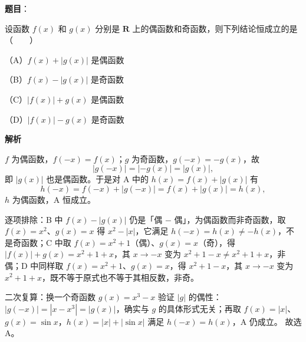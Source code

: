 \begin{answer}

\textbf{题目}：

设函数 $f(x)$ 和 $g(x)$ 分别是 $\mathbf R$ 上的偶函数和奇函数，则下列结论恒成立的是\mbox{（　　）}

（A）$f(x)+|g(x)|$ 是偶函数

（B）$f(x)-|g(x)|$ 是奇函数

（C）$|f(x)|+g(x)$ 是偶函数

（D）$|f(x)|-g(x)$ 是奇函数

\textbf{解析}

$f$ 为偶函数，$f(-x)=f(x)$；$g$ 为奇函数，$g(-x)=-g(x)$，故
\nopagebreak[4]
\[|g(-x)|=|-g(x)|=|g(x)|,\]
即 $|g(x)|$ 也是偶函数。于是对 A 中的 $h(x)=f(x)+|g(x)|$ 有
\nopagebreak[4]
\[h(-x)=f(-x)+|g(-x)|=f(x)+|g(x)|=h(x),\]
$h$ 为偶函数，A 恒成立。

逐项排除：B 中 $f(x)-|g(x)|$ 仍是「偶 $-$ 偶」，为偶函数而非奇函数，取 $f(x)=x^2$、$g(x)=x$ 得 $x^2-|x|$，它满足 $h(-x)=h(x)\ne-h(x)$，不是奇函数；C 中取 $f(x)=x^2+1$（偶）、$g(x)=x$（奇），得 $|f(x)|+g(x)=x^2+1+x$，其 $x\to-x$ 变为 $x^2+1-x\ne x^2+1+x$，非偶；D 中同样取 $f(x)=x^2+1$、$g(x)=x$，得 $x^2+1-x$，其 $x\to-x$ 变为 $x^2+1+x$，既不等于原式也不等于其相反数，非奇。

二次复算：换一个奇函数 $g(x)=x^3-x$ 验证 $|g|$ 的偶性：$|g(-x)|=|x-x^3|=|g(x)|$，确实与 $g$ 的具体形式无关；再取 $f(x)=|x|$、$g(x)=\sin x$，$h(x)=|x|+|\sin x|$ 满足 $h(-x)=h(x)$，A 仍成立。
故选 A。


\end{answer}
